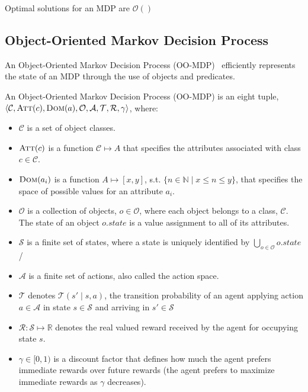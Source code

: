 \documentclass[11pt]{article}
\begin{document}
{\theorem Optimal solutions for an MDP are $\mathcal{O}()$}

\subsection{Object-Oriented Markov Decision Process}

An Object-Oriented Markov Decision Process (OO-MDP)~\cite{diuk08} efficiently represents the state
of an MDP through the use of objects and predicates. \\

{ An \textup{Object-Oriented Markov Decision Process (OO-MDP)} is an eight tuple, $\langle \mathcal{C}, \textsc{Att}(c), \textsc{Dom}(a), \mathcal{O},
\mathcal{A}, \mathcal{T}, \mathcal{R}, \gamma \rangle$, where:

\begin{itemize}
\item $\mathcal{C}$ is a set of object classes.
\item $\textsc{Att}(c)$ is a function $\mathcal{C} \mapsto A$ that specifies the attributes associated with class $c \in \mathcal{C}$.
\item $\textsc{Dom}(a_i)$ is a function $A \mapsto [x,y]$, s.t. $\{n \in \mathbb{N} \mid x \leq n \leq y \}$, that specifies the space of possible values for an attribute $a_i$.
\item $\mathcal{O}$ is a collection of objects, $o \in \mathcal{O}$, where each object belongs to a class, $\mathcal{C}$. The \textup{state} of an object $o.state$ is a value assignment to all of its attributes.
\item $\mathcal{S}$ is a finite set of states, where a state is uniquely identified by $\bigcup_{o \in \mathcal{O}} o.state$/
\item $\mathcal{A}$ is a finite set of actions, also called the \textup{action space}.
\item $\mathcal{T}$ denotes $\mathcal{T}(s' \mid s,a)$, the
transition probability of an agent applying action $a \in \mathcal{A}$
in state $s \in \mathcal{S}$ and arriving in $s' \in \mathcal{S}$
\item $\mathcal{R} : \mathcal{S} \mapsto \mathbb{R}$ denotes the real valued reward received by the agent for
occupying state $s$.
\item $\gamma \in [0, 1)$ is a discount factor that defines how much the
  agent prefers immediate rewards over future rewards (the agent
  prefers to maximize immediate rewards as $\gamma$ decreases).
\end{itemize}}
\end{document}
